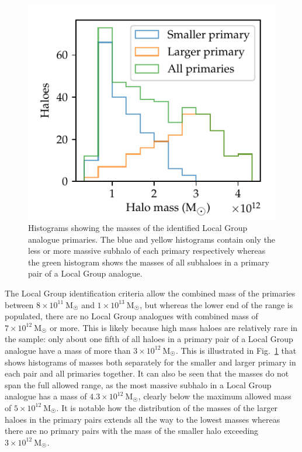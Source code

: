 \documentclass[english, oneside]{HYgradu}
\begin{document}
\begin{figure}
    \centering
    \includegraphics{kuvat/masshistogram.pdf}
    \caption{Histograms showing the masses of the identified Local Group analogue primaries. The blue and yellow histograms contain only the less or more massive subhalo of each primary respectively whereas the green histogram shows the masses of all subhaloes in a primary pair of a Local Group analogue.}\label{fig:masshistogram}
\end{figure}

The Local Group identification criteria allow the combined mass of the primaries between $8 \times 10^{11}~\mathrm{M_{\astrosun}}$ and $1 \times 10^{13}~\mathrm{M_{\astrosun}}$, but whereas the lower end of the range is populated, there are no Local Group analogues with combined mass of $7 \times 10^{12}~\mathrm{M_{\astrosun}}$ or more. This is likely because high mass haloes are relatively rare in the sample: only about one fifth of all haloes in a primary pair of a Local Group analogue have a mass of more than $3 \times 10^{12}~\mathrm{M}_{\astrosun}$. This is illustrated in Fig.~\ref{fig:masshistogram} that shows histograms of masses both separately for the smaller and larger primary in each pair and all primaries together. It can also be seen that the masses do not span the full allowed range, as the most massive subhalo in a Local Group analogue has a mass of $4.3 \times 10^{12}~\mathrm{M}_{\astrosun}$, %
clearly below the maximum allowed mass of $5 \times 10^{12}~\mathrm{M}_{\astrosun}$. It is notable how the distribution of the masses of the larger haloes in the primary pairs extends all the way to the lowest masses whereas there are no primary pairs with the mass of the smaller halo exceeding $3 \times 10^{12}~\mathrm{M}_{\astrosun}$. %
\end{document}
